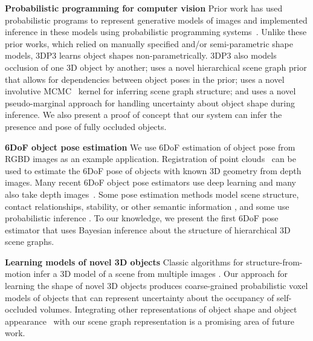 \textbf{Probabilistic programming for computer vision} Prior work has
used probabilistic programs to represent generative models of images
and implemented inference in these models using probabilistic
programming systems~\citep{mansinghka2013approximate,
  kulkarni2015picture}.  Unlike these prior works, which relied on
manually specified and/or semi-parametric shape models, 3DP3 learns
object shapes non-parametrically. 3DP3 also models occlusion of one 3D
object by another; uses a novel hierarchical scene graph prior that
allows for dependencies between object poses in the prior; uses a
novel involutive MCMC~\citep{cusumano2020automating} kernel for
inferring scene graph structure; and uses a novel pseudo-marginal
approach for handling uncertainty about object shape during
inference. We also present a proof of concept that our system can
infer the presence and pose of fully occluded objects.

\textbf{6DoF object pose estimation}
We use 6DoF estimation of object pose from RGBD images as an example application.
Registration of point clouds~\citep{besl1992method} can be used to estimate the 6DoF pose of objects
with known 3D geometry from depth images.
Many recent 6DoF object pose estimators use deep learning \citep{xiang2017posecnn, tremblay2018deep}
and many also take depth images~\citep{wang2019densefusion, tian2020robust}.
Some pose estimation methods model scene structure, contact relationships, stability, or other semantic information \citep{huang2018holistic, chen2019holistic++, kulkarni20193d, du2018stability, bao2011semantic}, and
some use probabilistic inference \citep{desingh2019efficient, chen2019grip, glover2012monte,deng2021poserbpf}.
To our knowledge, we present the first 6DoF pose estimator that uses
Bayesian inference about the structure of hierarchical 3D scene graphs.

\textbf{Learning models of novel 3D objects} Classic algorithms for structure-from-motion infer a 3D model of a scene from multiple images \citep{schonberger2016structure,agarwal2010bundle}.
Our approach for learning the shape of novel 3D objects produces coarse-grained probabilistic voxel models of objects
that can represent uncertainty about the occupancy of self-occluded volumes.
Integrating other representations of object shape and object appearance~\citep{mildenhall2020nerf} with our scene graph representation is a promising area of future work.
